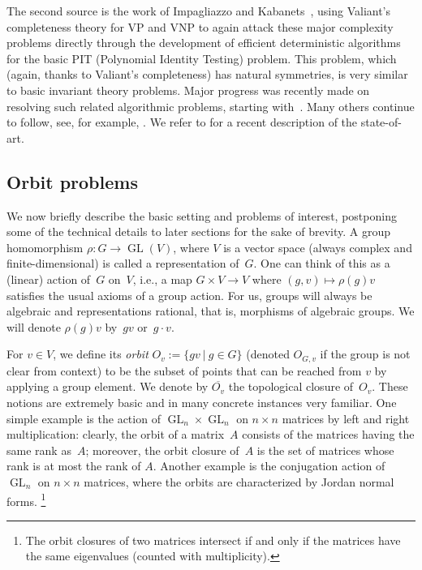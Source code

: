 \documentclass[10pt,a4paper]{article}
\DeclareMathOperator{\GL}{GL}
\theoremstyle{definition}
\numberwithin{equation}{section}
\begin{document}
The second source is the work of Impagliazzo and Kabanets~\cite{KI04}, using Valiant's completeness theory for VP and VNP to again attack these major
complexity problems directly through the development of efficient deterministic algorithms for the basic PIT (Polynomial Identity Testing) problem.
This problem, which (again, thanks to Valiant's completeness) has natural symmetries, is very similar to basic invariant theory problems.
Major progress was recently made on resolving such related algorithmic problems, starting with~\cite{Gur04,GGOW16,IQS,IQS2,DM-poly}.
Many others continue to follow, see, for example, \cite{DM-oc,AZGLOW,GGOW:20,BGOWW,BFGOWW,BLNW:20,BFGOWW2}.
We refer to \cite{BFGOWW2} for a recent description of the state-of-art.

%
\subsection{Orbit problems}\label{subsec:orbit}
%
We now briefly describe the basic setting and problems of interest, postponing some of the technical details to later sections for the sake of brevity.
A group homomorphism $\rho\colon G \rightarrow \GL(V)$, where $V$ is a vector space (always complex and finite-dimensional) is called a representation of~$G$.
One can think of this as a (linear) action of~$G$ on~$V$, i.e., a map $G \times V \rightarrow V$ where $(g,v) \mapsto \rho(g) v$ satisfies the usual axioms of a group action.
For us, groups will always be algebraic and representations rational, that is, morphisms of algebraic groups.
We will denote $\rho(g) v$ by~$gv$ or~$g \cdot v$.

For $v \in V$, we define its {\em orbit} $O_v := \{gv \ |\ g \in G\}$ (denoted $O_{G,v}$ if the group is not clear from context) to be the
subset of points that can be reached from $v$ by applying a group element.
We denote by $\overline{O_v}$ the topological closure of~$O_v$.
These notions are extremely basic and in many concrete instances very familiar.
One simple example is the action of $\GL_n \times \GL_n$ on $n \times n$ matrices by left and right multiplication:
clearly, the orbit of a matrix~$A$ consists of the matrices having the same rank as~$A$;
moreover, the orbit closure of~$A$ is the set of matrices whose rank is at most the rank of $A$.
Another example is the conjugation action of $\GL_n$ on $n \times n$ matrices, where the orbits are characterized by Jordan normal forms.
\footnote{The orbit closures of two matrices intersect if and only if the matrices have the same eigenvalues (counted with multiplicity).}
\end{document}
